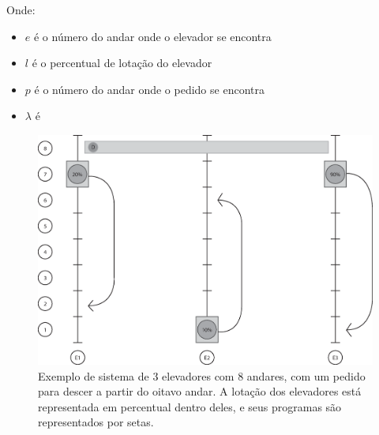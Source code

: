 Onde:
\begin{itemize}
\item \textbf{$e$} é o número do andar onde o elevador se encontra
\item \textbf{$l$} é o percentual de lotação do elevador
\item \textbf{$p$} é o número do andar onde o pedido se encontra
\item \textbf{$\lambda$} é
\end{itemize}

\begin{figure}[htb!]
  \centering
  \includegraphics[scale=0.6]{img/elevator_example1.eps}
  \caption[Exemplo de sistema de 3 elevadores com 8 andares]{Exemplo de sistema
    de 3 elevadores com 8 andares, com um pedido para descer a partir do oitavo
    andar. A lotação dos elevadores está representada em percentual dentro
    deles, e seus programas são representados por setas.}
  \label{fig:elevadores-1}
\end{figure}

